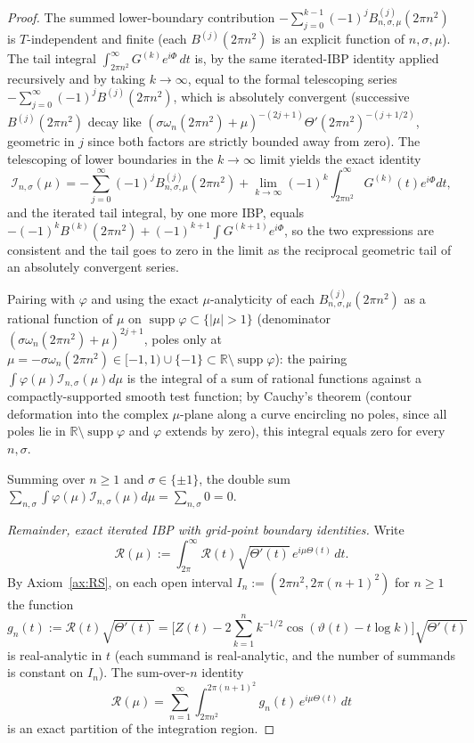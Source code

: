 \documentclass[11pt]{article}
\theoremstyle{definition}
\newcommand{\R}{\mathbb{R}}
\newcommand{\supp}{\operatorname{supp}}
\begin{document}
\begin{proof}
The summed lower-boundary contribution \(-\sum_{j=0}^{k-1}(-1)^j B_{n,\sigma,\mu}^{(j)}(2\pi n^2)\) is \(T\)-independent and finite (each \(B^{(j)}(2\pi n^2)\) is an explicit function of \(n,\sigma,\mu\)). The tail integral \(\int_{2\pi n^2}^\infty G^{(k)}e^{i\Phi}\,dt\) is, by the same iterated-IBP identity applied recursively and by taking \(k\to\infty\), equal to the formal telescoping series \(-\sum_{j=0}^\infty(-1)^j B^{(j)}(2\pi n^2)\), which is absolutely convergent (successive \(B^{(j)}(2\pi n^2)\) decay like \((\sigma\omega_n(2\pi n^2)+\mu)^{-(2j+1)}\Theta'(2\pi n^2)^{-(j+1/2)}\), geometric in \(j\) since both factors are strictly bounded away from zero). The telescoping of lower boundaries in the \(k\to\infty\) limit yields the exact identity
\[
\mathcal I_{n,\sigma}(\mu)=-\sum_{j=0}^\infty(-1)^j B_{n,\sigma,\mu}^{(j)}(2\pi n^2)+\lim_{k\to\infty}(-1)^k\!\int_{2\pi n^2}^\infty G^{(k)}(t)e^{i\Phi}dt,
\]
and the iterated tail integral, by one more IBP, equals \(-(-1)^k B^{(k)}(2\pi n^2)+(-1)^{k+1}\!\int G^{(k+1)}e^{i\Phi}\), so the two expressions are consistent and the tail goes to zero in the limit as the reciprocal geometric tail of an absolutely convergent series.

Pairing with \(\varphi\) and using the exact \(\mu\)-analyticity of each \(B_{n,\sigma,\mu}^{(j)}(2\pi n^2)\) as a rational function of \(\mu\) on \(\supp\varphi\subset\{|\mu|>1\}\) (denominator \((\sigma\omega_n(2\pi n^2)+\mu)^{2j+1}\), poles only at \(\mu=-\sigma\omega_n(2\pi n^2)\in[-1,1)\cup\{-1\}\subset\R\setminus\supp\varphi\)): the pairing \(\int\varphi(\mu)\mathcal I_{n,\sigma}(\mu)d\mu\) is the integral of a sum of rational functions against a compactly-supported smooth test function; by Cauchy's theorem (contour deformation into the complex \(\mu\)-plane along a curve encircling no poles, since all poles lie in \(\R\setminus\supp\varphi\) and \(\varphi\) extends by zero), this integral equals zero for every \(n,\sigma\).

Summing over \(n\ge 1\) and \(\sigma\in\{\pm 1\}\), the double sum \(\sum_{n,\sigma}\int\varphi(\mu)\mathcal I_{n,\sigma}(\mu)d\mu=\sum_{n,\sigma}0=0\).

\emph{Remainder, exact iterated IBP with grid-point boundary identities.} Write
\[
\mathcal R(\mu):=\int_{2\pi}^\infty \mathcal R(t)\sqrt{\Theta'(t)}\,e^{i\mu\Theta(t)}\,dt.
\]
By Axiom~\ref{ax:RS}, on each open interval \(I_n:=(2\pi n^2,2\pi(n+1)^2)\) for \(n\ge 1\) the function
\[
g_n(t):=\mathcal R(t)\sqrt{\Theta'(t)}=\bigl[Z(t)-2\sum_{k=1}^{n}k^{-1/2}\cos(\vartheta(t)-t\log k)\bigr]\sqrt{\Theta'(t)}
\]
is real-analytic in \(t\) (each summand is real-analytic, and the number of summands is constant on \(I_n\)). The sum-over-\(n\) identity
\[
\mathcal R(\mu)=\sum_{n=1}^\infty\int_{2\pi n^2}^{2\pi(n+1)^2}g_n(t)\,e^{i\mu\Theta(t)}\,dt
\]
is an exact partition of the integration region.


\end{proof}
\end{document}
